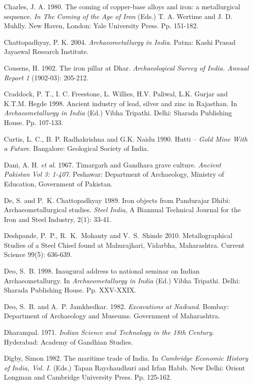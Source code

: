 \begin{thebibliography}{99}
 Charles, J. A. 1980. The coming of copper-base alloys and iron: a metallurgical sequence. \textit{In The Coming of the Age of Iron} (Eds.) T. A. Wertime and J. D. Muhlly. New Haven, London: Yale University Press. Pp. 151­-182. 

 Chattopadhyay, P. K. 2004. \textit{Archaeometallurgy in India}. Patna: Kashi Prasad Jayaswal Research Institute.

 Cousens, H. 1902. The iron pillar at Dhar. \textit{Archaeological Survey of India. Annual Report 1} (1902-03):  205-212.

 Craddock, P. T., I. C. Freestone, L. Willies, H.V. Paliwal, L.K. Gurjar and K.T.M. Hegde 1998. Ancient industry of lead, silver and zinc in Rajasthan. In \textit{Archaeometallurgy in India} (Ed.) Vibha Tripathi. Delhi: Sharada Publishing House. Pp. 107-133. 

 Curtis, L. C., B. P. Radhakrishna and G.K. Naidu 1990. Hutti – \textit{Gold Mine With a Future}. Bangalore: Geological Society of India.

 Dani, A. H. \textit{et al}. 1967. Timargarh and Gandhara grave culture. \textit{Ancient Pakistan Vol 3: 1-407}. Peshawar: Department of Archaeology, Ministry of Education, Government of Pakistan.

 De, S. and P.~K. Chattopadhyay 1989. Iron objects from Pandurajar Dhibi: Archaeometallurgical studies. \textit{Steel India}, A Biannual Technical Journal for the Iron and Steel Industry, 2(1): 33-41.

 Deshpande, P.~P., R.~K.~Mohanty and V.~S.~Shinde 2010. Metallographical Studies of a Steel Chisel found at Mahurajhari, Vidarbha, Maharashtra. Current Science 99(5): 636-639.

 Deo, S.~B. 1998. Inaugural address to national seminar on Indian Archaeometallurgy. In \textit{Archaeometallurgy in India} (Ed.) Vibha Tripathi. Delhi: Sharada Publishing House. Pp. XXV-XXIX. 

 Deo, S.~B. and A.~P. Jamkhedkar. 1982. \textit{Excavations at Naikund}. Bombay: Department of Archaeology and Museums. Government of Maharashtra. 

 Dharampal. 1971. \textit{Indian Science and Technology in the 18th Century}. Hyderabad: Academy of Gandhian Studies.

 Digby, Simon 1982. The maritime trade of India. In \textit{Cambridge Economic History of India, Vol. I.} (Eds.) Tapan Raychaudhuri and Irfan Habib. New Delhi: Orient Longman and Cambridge University Press. Pp. 125-162. 


\end{thebibliography}
